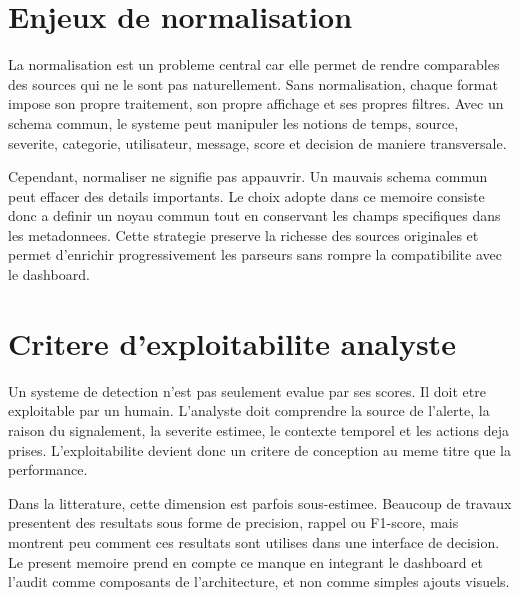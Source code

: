 \section{Enjeux de normalisation}
La normalisation est un probleme central car elle permet de rendre comparables des sources qui ne le sont pas naturellement. Sans normalisation, chaque format impose son propre traitement, son propre affichage et ses propres filtres. Avec un schema commun, le systeme peut manipuler les notions de temps, source, severite, categorie, utilisateur, message, score et decision de maniere transversale.

Cependant, normaliser ne signifie pas appauvrir. Un mauvais schema commun peut effacer des details importants. Le choix adopte dans ce memoire consiste donc a definir un noyau commun tout en conservant les champs specifiques dans les metadonnees. Cette strategie preserve la richesse des sources originales et permet d'enrichir progressivement les parseurs sans rompre la compatibilite avec le dashboard.

\section{Critere d'exploitabilite analyste}
Un systeme de detection n'est pas seulement evalue par ses scores. Il doit etre exploitable par un humain. L'analyste doit comprendre la source de l'alerte, la raison du signalement, la severite estimee, le contexte temporel et les actions deja prises. L'exploitabilite devient donc un critere de conception au meme titre que la performance.

Dans la litterature, cette dimension est parfois sous-estimee. Beaucoup de travaux presentent des resultats sous forme de precision, rappel ou F1-score, mais montrent peu comment ces resultats sont utilises dans une interface de decision. Le present memoire prend en compte ce manque en integrant le dashboard et l'audit comme composants de l'architecture, et non comme simples ajouts visuels.


